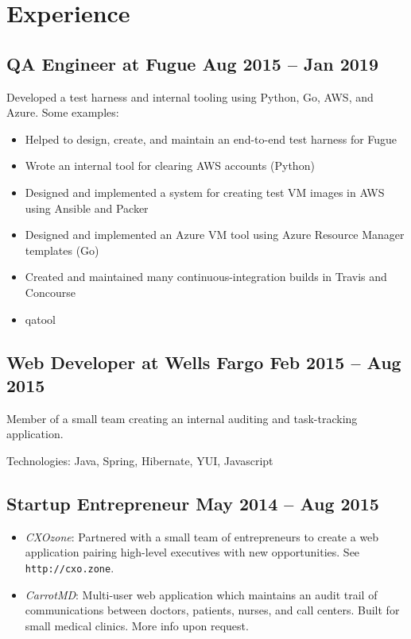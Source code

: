 \documentclass[12pt]{article}
\begin{document}

\section*{Experience}

\subsection*{QA Engineer at Fugue \hfill Aug 2015 -- Jan 2019}

Developed a test harness and internal tooling using Python, Go, AWS, and Azure.
Some examples:

\begin{itemize}
\item Helped to design, create, and maintain an end-to-end test harness for
  Fugue
\item Wrote an internal tool for clearing AWS accounts (Python)
\item Designed and implemented a system for creating test VM images in AWS using
  Ansible and Packer
\item Designed and implemented an Azure VM tool using Azure Resource Manager
  templates (Go)
\item Created and maintained many continuous-integration builds in Travis and
  Concourse
\item qatool
\end{itemize}

\subsection*{Web Developer at Wells Fargo \hfill Feb 2015 -- Aug 2015}

Member of a small team creating an internal auditing and task-tracking
application.

Technologies: Java, Spring, Hibernate, YUI, Javascript

\subsection*{Startup Entrepreneur \hfill May 2014 -- Aug 2015}

\begin{itemize}
  \item \textit{CXOzone}: Partnered with a small team of entrepreneurs to create
    a web application pairing high-level executives with new opportunities. See
    \texttt{http://cxo.zone}.

  \item \textit{CarrotMD}: Multi-user web application which maintains an audit
    trail of communications between doctors, patients, nurses, and call centers.
    Built for small medical clinics. More info upon request.
\end{itemize}
\end{document}
